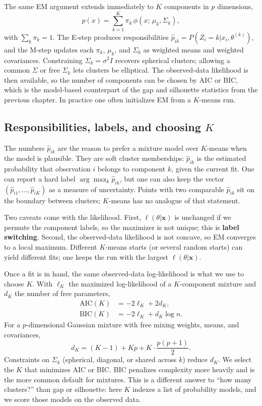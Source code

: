 \documentclass[
]{book}
\begin{document}
The same EM argument extends immediately to \(K\) components in \(p\) dimensions,
\[p(x) = \sum_{k=1}^{K} \pi_k\,\phi(x;\,\mu_k, \Sigma_k),\]
with \(\sum_k \pi_k = 1\). The E-step produces responsibilities \(\hat{p}_{ik} = P(Z_i=k|x_i,\theta^{(k)})\), and the M-step updates each \(\pi_k\), \(\mu_k\), and \(\Sigma_k\) as weighted means and weighted covariances. Constraining \(\Sigma_k = \sigma^2 I\) recovers spherical clusters; allowing a common \(\Sigma\) or free \(\Sigma_k\) lets clusters be elliptical. The observed-data likelihood is then available, so the number of components can be chosen by AIC or BIC, which is the model-based counterpart of the gap and silhouette statistics from the previous chapter. In practice one often initializes EM from a \(K\)-means run.

\subsection*{\texorpdfstring{Responsibilities, labels, and choosing \(K\)}{Responsibilities, labels, and choosing K}}\label{responsibilities-labels-and-choosing-k}

The numbers \(\hat{p}_{ik}\) are the reason to prefer a mixture model over \(K\)-means when the model is plausible. They are soft cluster memberships: \(\hat{p}_{ik}\) is the estimated probability that observation \(i\) belongs to component \(k\), given the current fit. One can report a hard label \(\arg\max_k \hat{p}_{ik}\), but one can also keep the vector \((\hat{p}_{i1},\ldots,\hat{p}_{iK})\) as a measure of uncertainty. Points with two comparable \(\hat{p}_{ik}\) sit on the boundary between clusters; \(K\)-means has no analogue of that statement.

Two caveats come with the likelihood. First, \(\ell(\theta|\mathbf{x})\) is unchanged if we permute the component labels, so the maximizer is not unique; this is \textbf{label switching}. Second, the observed-data likelihood is not concave, so EM converges to a local maximum. Different \(K\)-means starts (or several random starts) can yield different fits; one keeps the run with the largest \(\ell(\theta|\mathbf{x})\).

Once a fit is in hand, the same observed-data log-likelihood is what we use to choose \(K\). With \(\ell_K\) the maximized log-likelihood of a \(K\)-component mixture and \(d_K\) the number of free parameters,
\begin{align*}
\mathrm{AIC}(K) &= -2\ell_K + 2d_K,\\
\mathrm{BIC}(K) &= -2\ell_K + d_K\log n.
\end{align*}
For a \(p\)-dimensional Gaussian mixture with free mixing weights, means, and covariances,
\[d_K = (K-1) + Kp + K\cdot\frac{p(p+1)}{2}.\]
Constraints on \(\Sigma_k\) (spherical, diagonal, or shared across \(k\)) reduce \(d_K\). We select the \(K\) that minimizes AIC or BIC. BIC penalizes complexity more heavily and is the more common default for mixtures. This is a different answer to ``how many clusters?'' than gap or silhouette: here \(K\) indexes a list of probability models, and we score those models on the observed data.
\end{document}
